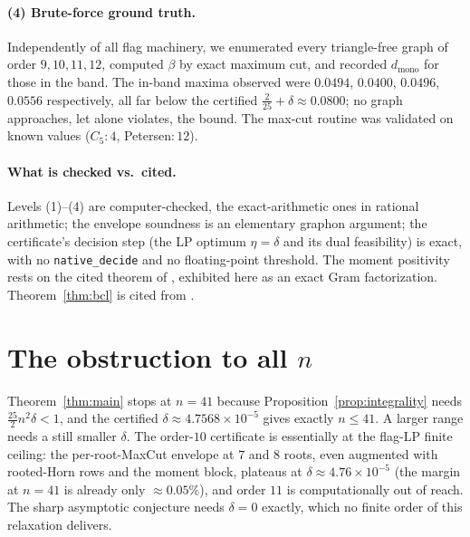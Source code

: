 \documentclass[11pt]{article}
\theoremstyle{remark}
\newcommand{\bip}{\beta}
\newcommand{\dmono}{d_{\mathrm{mono}}}
\begin{document}
\paragraph{(4) Brute-force ground truth.} Independently of all flag machinery, we
enumerated every triangle-free graph of order $9,10,11,12$, computed $\bip$ by
exact maximum cut, and recorded $\dmono$ for those in the band. The in-band maxima
observed were $0.0494$, $0.0400$, $0.0496$, $0.0556$ respectively, all far below
the certified $\tfrac2{25}+\delta\approx 0.0800$; no graph approaches, let alone
violates, the bound. The max-cut routine was validated on known values
($C_5\!:4$, Petersen$:12$).

\paragraph{What is checked vs.\ cited.} Levels (1)--(4) are computer-checked, the
exact-arithmetic ones in rational arithmetic; the envelope soundness is an
elementary graphon argument; the certificate's decision step (the LP optimum
$\eta=\delta$ and its dual feasibility) is exact, with no \texttt{native\_decide}
and no floating-point threshold. The moment positivity rests on the cited theorem
of \cite{Raz07}, exhibited here as an exact Gram factorization.
Theorem~\ref{thm:bcl} is cited from \cite{BCL21}.

\section{The obstruction to all $n$}\label{sec:open}

Theorem~\ref{thm:main} stops at $n=41$ because Proposition~\ref{prop:integrality}
needs $\tfrac{25}{2}n^2\delta<1$, and the certified $\delta\approx 4.7568\times10^{-5}$
gives exactly $n\le 41$. A larger range needs a still smaller $\delta$. The order-$10$
certificate is essentially at the flag-LP finite ceiling: the per-root-MaxCut envelope
at $7$ and $8$ roots, even augmented with rooted-Horn rows and the moment block,
plateaus at $\delta\approx 4.76\times10^{-5}$ (the margin at $n=41$ is already only
$\approx0.05\%$), and order $11$ is computationally out of reach. The sharp asymptotic
conjecture needs $\delta=0$ exactly, which no finite order of this relaxation delivers.
\end{document}
